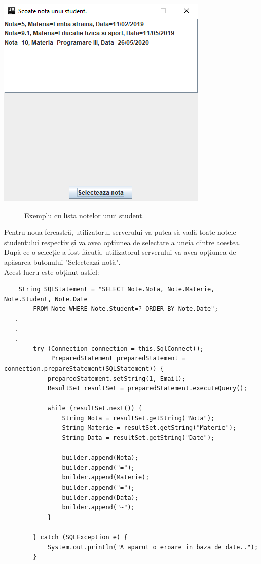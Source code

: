 \documentclass{article}
\begin{document}
	\begin{center}
		\includegraphics[scale=0.8]{Source/ServerScoateLista}
		\begin{figure}[!h]
			{\caption*{Exemplu cu lista notelor unui student.}}
		\end{figure}
	\end{center}

		Pentru noua fereastră, utilizatorul serverului va putea să vadă toate notele studentului respectiv și va avea opțiunea de selectare a uneia dintre acestea. După ce o selecție a fost făcută, utilizatorul serverului va avea opțiunea de apăsarea butonului "Selectează notă". \\

		Acest lucru este obținut astfel:
\begin{verbatim}
    String SQLStatement = "SELECT Note.Nota, Note.Materie, Note.Student, Note.Date 
        FROM Note WHERE Note.Student=? ORDER BY Note.Date";
   .
   .
   .
        try (Connection connection = this.SqlConnect();
             PreparedStatement preparedStatement = connection.prepareStatement(SQLStatement)) {
            preparedStatement.setString(1, Email);
            ResultSet resultSet = preparedStatement.executeQuery();

            while (resultSet.next()) {
                String Nota = resultSet.getString("Nota");
                String Materie = resultSet.getString("Materie");
                String Data = resultSet.getString("Date");

                builder.append(Nota);
                builder.append("=");
                builder.append(Materie);
                builder.append("=");
                builder.append(Data);
                builder.append("~");
            }

        } catch (SQLException e) {
            System.out.println("A aparut o eroare in baza de date..");
        }
\end{verbatim}
\end{document}
